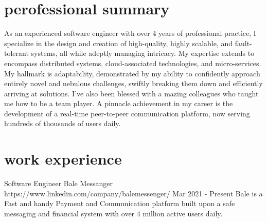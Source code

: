 \documentclass[a4paper,20pt]{article}
\begin{document}
\begin{minipage}[t]{0.65\textwidth}
  \preparetopsec
  \section{perofessional summary}
    \begin{justify}
      \begin{footnotesize}As an experienced software engineer with over 4 years of professional practice, 
      I specialize in the design and creation of high-quality, highly scalable, 
      and fault-tolerant systems, all while adeptly managing intricacy. My expertise 
      extends to encompass distributed systems, cloud-associated technologies, and 
      micro-services. My hallmark is adaptability, demonstrated by my ability to 
      confidently approach entirely novel and nebulous challenges, swiftly breaking 
      them down and efficiently arriving at solutions. I've also been blessed with a
      mazing colleagues who taught me how to be a team player. A pinnacle achievement 
      in my career is the development of a real-time peer-to-peer communication platform, 
      now serving hundreds of thousands of users daily.
      \end{footnotesize}
    \end{justify}
  \preparenormalsec
  \section{work experience}
  {
    \expheadingwithlink
      {Software Engineer}
      {Bale Messanger}
      {https://www.linkedin.com/company/balemessenger/}
      {Mar 2021 - Present}
      {Bale is a Fast and handy Payment and Communication platform built upon a safe messaging and financial system with over 4 million active users daily.}

}
\end{minipage}
\end{document}
